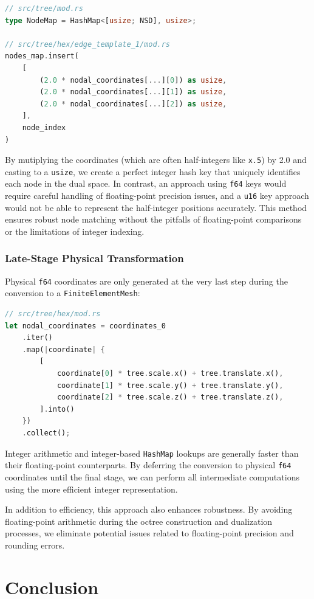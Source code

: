 \documentclass[review,12pt]{elsarticle}
\begin{document}
\begin{lstlisting}[language=Rust, caption={Rust implementation using the \lstinline!NodeMap! with integer keys scaled by 2.}, label={lst:node_map_scale_2}]
// src/tree/mod.rs
type NodeMap = HashMap<[usize; NSD], usize>;

// src/tree/hex/edge_template_1/mod.rs
nodes_map.insert(
    [
        (2.0 * nodal_coordinates[...][0]) as usize,
        (2.0 * nodal_coordinates[...][1]) as usize,
        (2.0 * nodal_coordinates[...][2]) as usize,
    ],
    node_index
)
\end{lstlisting}

By mutiplying the coordinates (which are often half-integers like \lstinline!x.5!) by 2.0 and casting to a \lstinline!usize!, we create a perfect integer hash key that uniquely identifies each node in the dual space. In contrast, an approach using \lstinline!f64! keys would require careful handling of floating-point precision issues, and a \lstinline!u16! key approach would not be able to represent the half-integer positions accurately. This method ensures robust node matching without the pitfalls of floating-point comparisons or the limitations of integer indexing.

\subsubsection{Late-Stage Physical Transformation}
Physical \lstinline!f64! coordinates are only generated at the very last step during the conversion to a \lstinline!FiniteElementMesh!:

\begin{lstlisting}[language=Rust, caption={Late-stage physical transformation of node coordinates.}, label={lst:late_stage_transform}]
// src/tree/hex/mod.rs
let nodal_coordinates = coordinates_0
    .iter()
    .map(|coordinate| {
        [
            coordinate[0] * tree.scale.x() + tree.translate.x(),
            coordinate[1] * tree.scale.y() + tree.translate.y(),
            coordinate[2] * tree.scale.z() + tree.translate.z(),
        ].into()
    })
    .collect();
\end{lstlisting}

Integer arithmetic and integer-based \lstinline!HashMap! lookups are generally faster than their floating-point counterparts. By deferring the conversion to physical \lstinline!f64! coordinates until the final stage, we can perform all intermediate computations using the more efficient integer representation.

In addition to efficiency, this approach also enhances robustness. By avoiding floating-point arithmetic during the octree construction and dualization processes, we eliminate potential issues related to floating-point precision and rounding errors.

\section{Conclusion}
%
\end{document}
